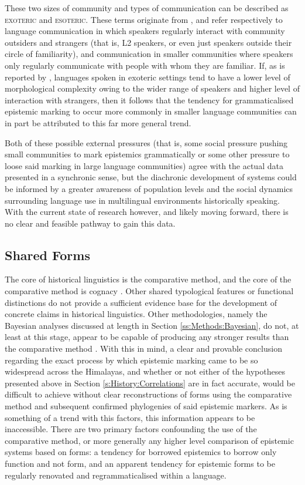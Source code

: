 These two sizes of community and types of communication can be described as \textsc{exoteric} and \textsc{esoteric}. These terms originate from , and refer respectively to language communication in which speakers regularly interact with community outsiders and strangers (that is, L2 speakers, or even just speakers outside their circle of familiarity), and communication in smaller communities where speakers only regularly communicate with people with whom they are familiar. If, as is reported by , languages spoken in exoteric settings tend to have a lower level of morphological complexity owing to the wider range of speakers and higher level of interaction with strangers, then it follows that the tendency for grammaticalised epistemic marking to occur more commonly in smaller language communities can in part be attributed to this far more general trend. 

Both of these possible external pressures (that is, some social pressure pushing small communities to mark epistemics grammatically or some other pressure to loose said marking in large language communities) agree with the actual data presented in a synchronic sense, but the diachronic development of systems could be informed by a greater awareness of population levels and the social dynamics surrounding language use in multilingual environments historically speaking. With the current state of research however, and likely moving forward, there is no clear and feasible pathway to gain this data.
\subsection{Shared Forms}\label{ss:History:SharedForms}
The core of historical linguistics is the comparative method, and the core of the comparative method is cognacy \cite{Hyslop2020Millet}. Other shared typological features or functional distinctions do not provide a sufficient evidence base for the development of concrete claims in historical linguistics. Other methodologies, namely the Bayesian analyses discussed at length in Section \ref{ss:Methods:Bayesian}, do not, at least at this stage, appear to be capable of producing any stronger results than the comparative method \cite{Dolin2022}. With this in mind, a clear and provable conclusion regarding the exact process by which epistemic marking came to be so widespread across the Himalayas, and whether or not either of the hypotheses presented above in Section \ref{s:History:Correlations} are in fact accurate, would be difficult to achieve without clear reconstructions of forms using the comparative method and subsequent confirmed phylogenies of said epistemic markers. As is something of a trend with this factors, this information appears to be inaccessible. There are two primary factors confounding the use of the comparative method, or more generally any higher level comparison of epistemic systems based on forms: a tendency for borrowed epistemics to borrow only function and not form, and an apparent tendency for epistemic forms to be regularly renovated and regrammaticalised within a language. 

